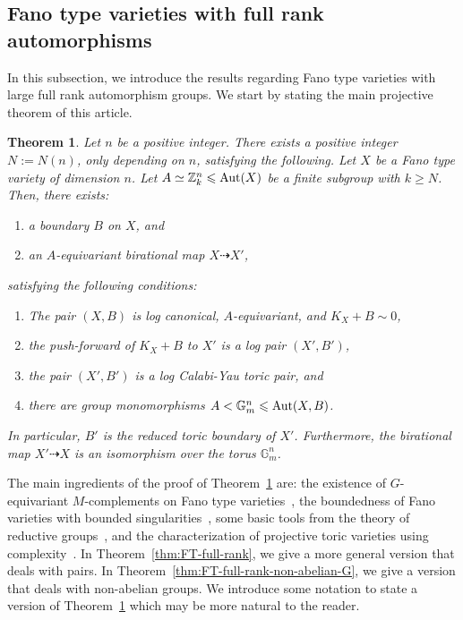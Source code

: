 \documentclass{amsart}
\newcommand{\zz}{\mathbb{Z}}
\newtheorem{introthm}{Theorem}
\theoremstyle{remark}
\numberwithin{equation}{section}
\begin{document}
\subsection{Fano type varieties with full rank automorphisms} In this subsection, we introduce the results regarding Fano type varieties with large full rank automorphism groups.
We start by stating the main projective theorem of this article.

\begin{introthm}\label{introthm:main-thm}
Let $n$ be a positive integer.
There exists a positive integer
$N:=N(n)$, only depending on $n$, satisfying the following.
Let $X$ be a Fano type variety of dimension $n$.
Let $A\simeq \zz_k^n \leqslant {\rm Aut}(X)$ be a finite subgroup with $k\geq N$.
Then, there exists:
\begin{enumerate}
\item a boundary $B$ on $X$, and
\item an $A$-equivariant birational map
$X\dashrightarrow X'$,
\end{enumerate}
satisfying the following conditions:
\begin{enumerate}
\item The pair $(X,B)$ is log canonical, $A$-equivariant, and $K_X+B\sim 0$,
\item the push-forward of $K_X+B$ to $X'$ is a log pair $(X',B')$, 
\item the pair $(X',B')$ is a log Calabi-Yau toric pair, and
\item there are group monomorphisms 
$A< \mathbb{G}_m^n\leqslant {\rm Aut}(X,B)$.
\end{enumerate}
In particular, $B'$ is the reduced toric boundary of $X'$.
Furthermore, the birational map
$X'\dashrightarrow X$ is an isomorphism over the torus $\mathbb{G}_m^n$.
\end{introthm}

The main ingredients of the proof of Theorem~\ref{introthm:main-thm} are: the existence of $G$-equivariant $M$-complements on Fano type varieties~\cites{Bir16a,Mor20}, 
the boundedness of Fano varieties with bounded singularities~\cite{Bir16b},
some basic tools from the theory of reductive groups~\cites{Bor91}, and
the characterization of projective toric varieties using complexity~\cite{BMSZ18}.
In Theorem~\ref{thm:FT-full-rank}, we give a more general version that deals with pairs.
In Theorem~\ref{thm:FT-full-rank-non-abelian-G}, we give a version that deals with non-abelian groups.
We introduce some notation to state a version of Theorem~\ref{introthm:main-thm} which may be more natural to the reader.
\end{document}
